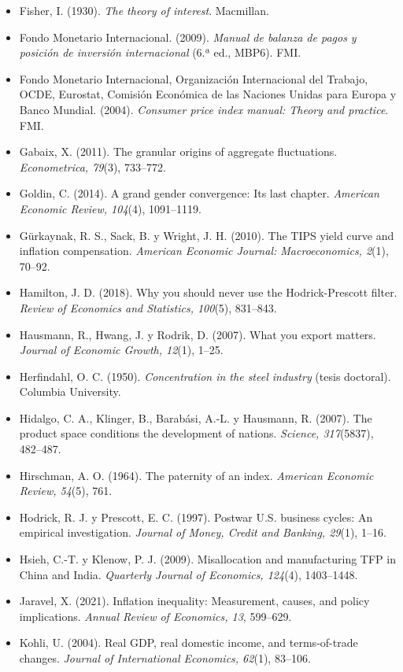 \begin{itemize}[leftmargin=1.2em,itemindent=-1.2em]
\item[] Fisher, I. (1930). \emph{The theory of interest}. Macmillan.
\item[] Fondo Monetario Internacional. (2009). \emph{Manual de balanza de pagos y posición de inversión internacional} (6.ª ed., MBP6). FMI.
\item[] Fondo Monetario Internacional, Organización Internacional del Trabajo, OCDE, Eurostat, Comisión Económica de las Naciones Unidas para Europa y Banco Mundial. (2004). \emph{Consumer price index manual: Theory and practice}. FMI.
\item[] Gabaix, X. (2011). The granular origins of aggregate fluctuations. \emph{Econometrica, 79}(3), 733–772.
\item[] Goldin, C. (2014). A grand gender convergence: Its last chapter. \emph{American Economic Review, 104}(4), 1091–1119.
\item[] Gürkaynak, R. S., Sack, B. y Wright, J. H. (2010). The TIPS yield curve and inflation compensation. \emph{American Economic Journal: Macroeconomics, 2}(1), 70–92.
\item[] Hamilton, J. D. (2018). Why you should never use the Hodrick-Prescott filter. \emph{Review of Economics and Statistics, 100}(5), 831–843.
\item[] Hausmann, R., Hwang, J. y Rodrik, D. (2007). What you export matters. \emph{Journal of Economic Growth, 12}(1), 1–25.
\item[] Herfindahl, O. C. (1950). \emph{Concentration in the steel industry} (tesis doctoral). Columbia University.
\item[] Hidalgo, C. A., Klinger, B., Barabási, A.-L. y Hausmann, R. (2007). The product space conditions the development of nations. \emph{Science, 317}(5837), 482–487.
\item[] Hirschman, A. O. (1964). The paternity of an index. \emph{American Economic Review, 54}(5), 761.
\item[] Hodrick, R. J. y Prescott, E. C. (1997). Postwar U.S. business cycles: An empirical investigation. \emph{Journal of Money, Credit and Banking, 29}(1), 1–16.
\item[] Hsieh, C.-T. y Klenow, P. J. (2009). Misallocation and manufacturing TFP in China and India. \emph{Quarterly Journal of Economics, 124}(4), 1403–1448.
\item[] Jaravel, X. (2021). Inflation inequality: Measurement, causes, and policy implications. \emph{Annual Review of Economics, 13}, 599–629.
\item[] Kohli, U. (2004). Real GDP, real domestic income, and terms-of-trade changes. \emph{Journal of International Economics, 62}(1), 83–106.

\end{itemize}
